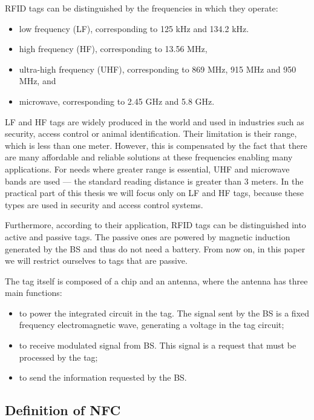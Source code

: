 RFID tags can be distinguished by the frequencies in which they operate:

\begin{itemize}
    \item low frequency (LF), corresponding to 125 kHz and 134.2 kHz.
    \item high frequency (HF), corresponding to 13.56 MHz, 
    \item ultra-high frequency (UHF), corresponding to 869 MHz, 915 MHz and 950 MHz, and
    \item microwave, corresponding to 2.45 GHz and 5.8 GHz.
\end{itemize}

LF and HF tags are widely produced in the world and used in industries such as security, access control or animal identification. Their limitation is their range, which is less than one meter. However, this is compensated by the fact that there are many affordable and reliable solutions at these frequencies enabling many applications. For needs where greater range is essential, UHF and microwave bands are used --- the standard reading distance is greater than 3 meters. In the practical part of this thesis we will focus only on LF and HF tags, because these types are used in security and access control systems.

Furthermore, according to their application, RFID tags can be distinguished into active and passive tags. The passive ones are powered by magnetic induction generated by the BS and thus do not need a battery. From now on, in this paper we will restrict ourselves to tags that are passive.


The tag itself is composed of a chip and an antenna, where the antenna has three main functions:

\begin{itemize}
    \item to power the integrated circuit in the tag. The signal sent by the BS is a fixed frequency electromagnetic wave, generating a voltage in the tag circuit;
    \item to receive modulated signal from BS. This signal is a request that must be processed by the tag;
    \item to send the information requested by the BS.
\end{itemize}

\subsection{Definition of NFC}

